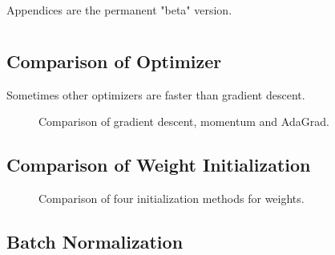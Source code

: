 \documentclass{article}
\theoremstyle{definition}
\renewcommand{\theequation}{\arabic{section}.\arabic{equation}}
\renewcommand{\thefigure}{\arabic{section}.\arabic{figure}}
\begin{document}

\newpage


\renewcommand\thefigure{\thesection.\arabic{figure}}
\renewcommand\theequation{\thesection.\arabic{equation}}

\begin{appendices}

Appendices are the permanent "beta" version.


\section{}


\subsection{Comparison of Optimizer}

Sometimes other optimizers are faster than gradient descent.

\begin{figure}[H]
    \centering
    \begin{subfigure}[H]{1.0\textwidth}
	\end{subfigure}
    \caption{Comparison of gradient descent, momentum and AdaGrad.}
    \label{fig:A.1}
\end{figure}


\subsection{Comparison of Weight Initialization}

\begin{figure}[H]
    \centering
    \begin{subfigure}[H]{1.0\textwidth}
	\end{subfigure}
    \caption{Comparison of four initialization methods for weights.}
    \label{fig:A.2}
\end{figure}


\subsection{Batch Normalization}


\end{appendices}
\end{document}

